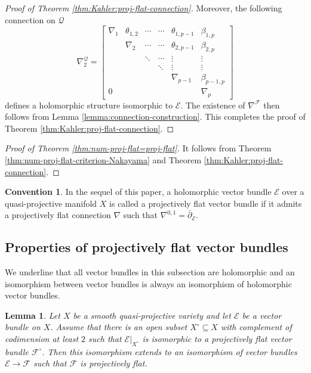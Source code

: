\documentclass[english,reqno]{amsart}
\newcommand\sE{{\mathscr E}}
\newcommand\sF{{\mathscr F}}
\newcommand\sQ{{\mathscr Q}}
\theoremstyle{plain}
\newtheorem{lemma}[thm]{Lemma}
\theoremstyle{definition}
\newtheorem{convention}[thm]{Convention}
\numberwithin{equation}{section} %
\begin{document}
\begin{proof}[Proof of Theorem \ref{thm:Kahler:proj-flat-connection}]
    Moreover,  the following connection on $\sQ$
    \[
    \nabla^{\sQ}_2 =
    \begin{bmatrix}
    \nabla_1 & \theta_{1,2} & \cdots & \cdots & \theta_{1,p-1} & \beta_{1,p} \\
    & \nabla_2  & \cdots & \cdots& \theta_{2,p-1} & \beta_{2,p} \\
    & &\ddots & \cdots & \vdots & \vdots \\
    & & & \ddots & \vdots & \vdots \\
    & & & & \nabla_{p-1} & \beta_{p-1,p} \\
    0 & & & & & \nabla_p
    \end{bmatrix}
    \]
    defines a holomorphic structure isomorphic to $\sE$.  The existence of $\nabla^\sF$ then follows from Lemma \ref{lemma:connection-construction}. This completes the proof of  Theorem \ref{thm:Kahler:proj-flat-connection}.
\end{proof}



\begin{proof}[Proof of Theorem  \ref{thm:num-proj-flat=proj-flat}]
It follows from Theorem \ref{thm:num-proj-flat-criterion-Nakayama} and  Theorem \ref{thm:Kahler:proj-flat-connection}.
\end{proof}

\begin{convention}
    In the sequel of this paper, a holomorphic vector bundle $\sE$ over a quasi-projective manifold $X$ is called a projectively flat vector bundle if it admits a projectively flat connection $\nabla$ such that $\nabla^{0,1}=\bar{\partial}_{\sE}$.
\end{convention}


\subsection{Properties of projectively flat vector bundles}
We underline that all  vector bundles in this subsection are  holomorphic and an isomorphism between vector bundles is always an isomorphism of holomorphic vector bundles.

\begin{lemma}
\label{lemma:extension-proj-flat-vec-bundle}
Let $X$ be a smooth quasi-projective variety and let $\sE$ be a vector bundle on $X$. Assume that there is an open subset $X^\circ \subseteq X$ with complement of codimension at least $2$ such that $\sE|_{X^\circ}$ is isomorphic to a projectively flat vector bundle $\sF^\circ$. Then this isomorphism extends to an isomorphism of vector bundles $\sE \to \sF$ such that $\sF$ is projectively flat.
\end{lemma}
\end{document}
